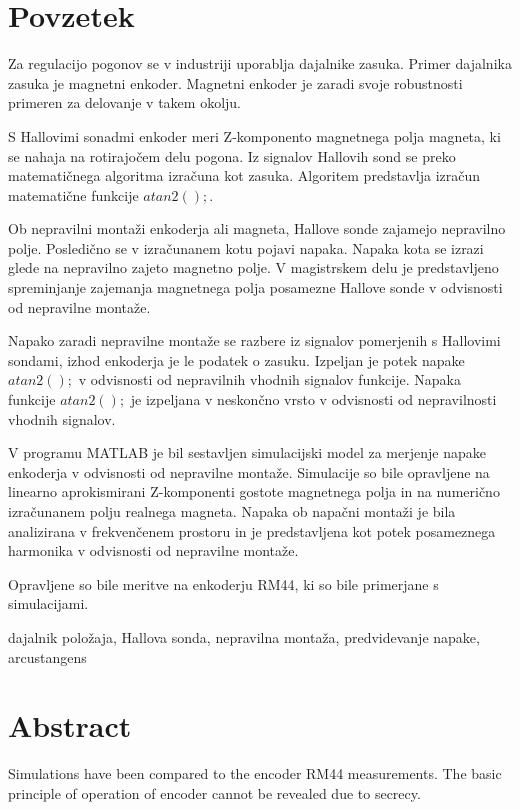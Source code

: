 \documentclass[a4paper,twoside,openright,12pt]{book}
\begin{document}
\chapter*{Povzetek}


Za regulacijo pogonov se v industriji uporablja dajalnike zasuka.
Primer dajalnika zasuka je magnetni enkoder.
Magnetni enkoder je zaradi svoje robustnosti primeren za delovanje v takem okolju.

S Hallovimi sonadmi enkoder meri Z-komponento magnetnega polja magneta, ki se nahaja na rotirajočem delu pogona.
Iz signalov Hallovih sond se preko matematičnega algoritma izračuna kot zasuka.
Algoritem predstavlja izračun matematične funkcije $atan2();$.

Ob nepravilni montaži enkoderja ali magneta, Hallove sonde zajamejo nepravilno polje. Posledično se v izračunanem kotu pojavi napaka.
Napaka kota se izrazi glede na nepravilno zajeto magnetno polje. V magistrskem delu je predstavljeno spreminjanje zajemanja magnetnega polja posamezne Hallove sonde v odvisnosti od nepravilne montaže.

Napako zaradi nepravilne montaže se razbere iz signalov pomerjenih s Hallovimi sondami, izhod enkoderja je le podatek o zasuku.
Izpeljan je potek napake  $atan2();$ v odvisnosti od nepravilnih vhodnih signalov funkcije. Napaka funkcije $atan2();$  je izpeljana v neskončno vrsto v odvisnosti od nepravilnosti vhodnih signalov.

V programu MATLAB je bil sestavljen simulacijski model za merjenje napake enkoderja v odvisnosti od nepravilne montaže.
Simulacije so bile opravljene na linearno aprokismirani Z-komponenti gostote magnetnega polja in na numerično izračunanem polju realnega magneta.
Napaka ob napačni montaži je bila analizirana v frekvenčenem prostoru in je predstavljena kot potek posameznega harmonika v odvisnosti od nepravilne montaže.

Opravljene so bile meritve na enkoderju RM44, ki so bile primerjane s simulacijami.

\kljucnebesede  dajalnik položaja, Hallova sonda, nepravilna montaža, predvidevanje napake, arcustangens
\chapter*{Abstract}

Simulations have been compared to the encoder RM44 measurements. The basic principle of operation of encoder cannot be revealed due to secrecy.
\end{document}
